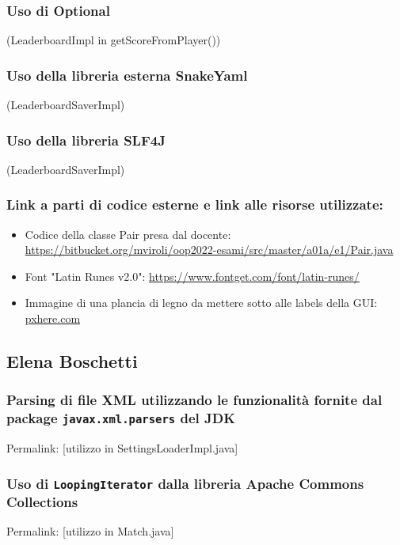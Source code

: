 \documentclass[a4paper,12pt]{report}
\begin{document}
\subsubsection{Uso di Optional}
(LeaderboardImpl in getScoreFromPlayer())

\subsubsection{Uso della libreria esterna SnakeYaml}
(LeaderboardSaverImpl)

\subsubsection{Uso della libreria SLF4J}
(LeaderboardSaverImpl)

\subsubsection{Link a parti di codice esterne e link alle risorse utilizzate:}

\begin{itemize}
	
	\item Codice della classe Pair presa dal docente: \url{https://bitbucket.org/mviroli/oop2022-esami/src/master/a01a/e1/Pair.java}
	\item Font "Latin Runes v2.0": \url{ https://www.fontget.com/font/latin-runes/}
	\item Immagine di una plancia di legno da mettere sotto alle labels della GUI: \href{https://get.pxhere.com/photo/background-tree-wood-boards-texture-wooden-background-old-brown-wood-texture-gray-wood-old-tree-old-fence-the-texture-of-the-wood-rustik-rustic-rural-wood-background-old-boards-fence-1370487.jpg}{pxhere.com}
	
\end{itemize}

\subsection{Elena Boschetti}

\subsubsection{Parsing di file XML utilizzando le funzionalità fornite dal package \texttt{javax.xml.parsers} del JDK}
Permalink: [utilizzo in SettingsLoaderImpl.java]

\subsubsection{Uso di \texttt{LoopingIterator} dalla libreria Apache Commons Collections}
Permalink: [utilizzo in Match.java]
\end{document}

